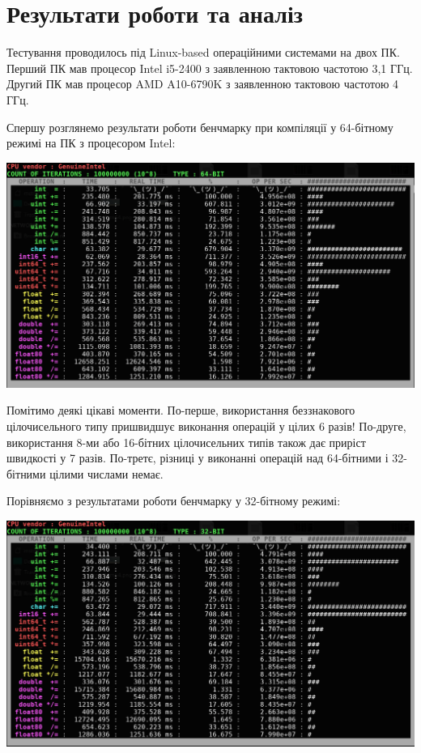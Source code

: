 \section{Результати роботи та аналіз}

Тестування проводилось під Linux-based операційними системами на двох ПК. Перший ПК мав процесор Intel i5-2400 з заявленною тактовою частотою 3,1 ГГц. Другий ПК мав процесор AMD A10-6790K з заявленною тактовою частотою 4 ГГц. 

Спершу розглянемо результати роботи бенчмарку при компіляції у 64-бітному режимі на ПК з процесором Intel:

\includegraphics[width = 16cm]{img/intel64.png}

Помітимо деякі цікаві моменти. По-перше, використання беззнакового цілочисельного типу пришвидшує виконання операцій у цілих 6 разів! По-друге, використання 8-ми або 16-бітних цілочисельних типів також дає приріст швидкості у 7 разів. По-третє, різниці у виконанні операцій над 64-бітними і 32-бітними цілими числами немає. 

Порівняємо з результатами роботи бенчмарку у 32-бітному режимі:

\includegraphics[width = 16cm]{img/intel32.png}

